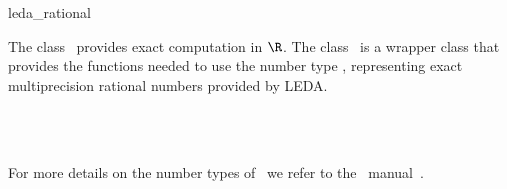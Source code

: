 \ccDefGlobalScope{}
\begin{ccRefClass}{leda_rational}

\ccDefinition

The class \ccRefName\ provides exact computation in $\R$.
The class \ccRefName\ is a wrapper class that provides the functions 
needed to use the number type , representing exact 
multiprecision rational numbers provided by {\sc LEDA}. 



\ccIsModel
{}\\
\\

For more details on the number types of \leda\ we refer to the \leda\
manual~\cite{cgal:mnsu-lum}.

\end{ccRefClass}
